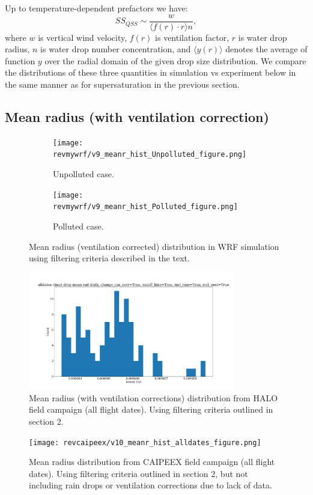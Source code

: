 \documentclass{article}
\begin{document}
Up to temperature-dependent prefactors we have:
\begin{equation}
SS_{QSS} \sim \frac{w}{\langle f(r)\cdot r \rangle n},
\end{equation}
where $w$ is vertical wind velocity, $f(r)$ is ventilation factor, $r$ is water drop radius, $n$ is water drop number concentration, and $\langle y(r) \rangle$ denotes the average of function $y$ over the radial domain of the given drop size distribution. We compare the distributions of these three quantities in simulation vs experiment below in the same manner as for supersaturation in the previous section.

\subsection{Mean radius (with ventilation correction)}

\begin{figure}[ht]
	\centering
	\begin{subfigure}{0.7\textwidth}
		\texttt{[image: revmywrf/v9\_meanr\_hist\_Unpolluted\_figure.png]}
		\caption{Unpolluted case.}
		\label{wrfmeanrhistunpoll}
	\end{subfigure}
	\begin{subfigure}{0.7\textwidth}
		\texttt{[image: revmywrf/v9\_meanr\_hist\_Polluted\_figure.png]}
		\caption{Polluted case.}
		\label{wrfmeanrhistpoll}
	\end{subfigure}
	\caption{Mean radius (ventilation corrected) distribution in WRF simulation using filtering criteria described in the text.}
	\label{wrfmeanrhist}
\end{figure}
\begin{figure}[ht]
    \centering
    \includegraphics[width=9cm]{revhalo/v24_meanr_hist_cas_alldates_figure.png}
    \caption{Mean radius (with ventilation corrections) distribution from HALO field campaign (all flight dates). Using filtering criteria outlined in section 2.}
    \label{haloqsshist}
\end{figure}
\begin{figure}[ht]
    \centering
    \texttt{[image: revcaipeex/v10\_meanr\_hist\_alldates\_figure.png]}
    \caption{Mean radius distribution from CAIPEEX field campaign (all flight dates). Using filtering criteria outlined in section 2, but not including rain drops or ventilation corrections due to lack of data.}
    \label{caipeexqsshist}
\end{figure}
\end{document}
